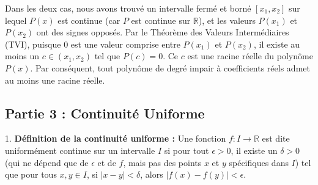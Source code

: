 \documentclass[12pt,a4paper]{report}
\begin{document}
        Dans les deux cas, nous avons trouvé un intervalle fermé et borné $[x_1, x_2]$ sur lequel $P(x)$ est continue (car $P$ est continue sur $\mathbb{R}$), et les valeurs $P(x_1)$ et $P(x_2)$ ont des signes opposés.
        Par le Théorème des Valeurs Intermédiaires (TVI), puisque $0$ est une valeur comprise entre $P(x_1)$ et $P(x_2)$, il existe au moins un $c \in (x_1, x_2)$ tel que $P(c) = 0$.
        Ce $c$ est une racine réelle du polynôme $P(x)$.
        Par conséquent, tout polynôme de degré impair à coefficients réels admet au moins une racine réelle.

\subsection{Partie 3 : Continuité Uniforme}

1.  \textbf{Définition de la continuité uniforme :}
    Une fonction $f: I \to \mathbb{R}$ est dite uniformément continue sur un intervalle $I$ si pour tout $\epsilon > 0$, il existe un $\delta > 0$ (qui ne dépend que de $\epsilon$ et de $f$, mais pas des points $x$ et $y$ spécifiques dans $I$) tel que pour tous $x, y \in I$, si $|x - y| < \delta$, alors $|f(x) - f(y)| < \epsilon$.
\end{document}
